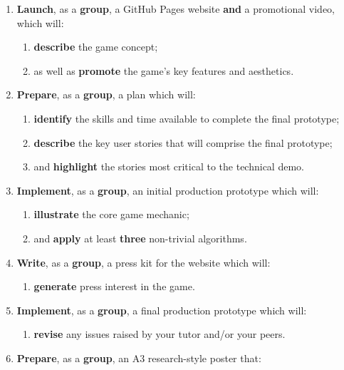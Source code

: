 \documentclass{../fal_assignment}
\begin{document}
\begin{enumerate}[label=(\Alph*)]
    \item \textbf{Launch}, as a \textbf{group}, a GitHub Pages website \textbf{and} a promotional video, which will:
    	\begin{enumerate}[label=\roman*.]
    		\item \textbf{describe} the game concept;
    		\item as well as \textbf{promote} the game's key features and aesthetics.
	\end{enumerate}
    \item \textbf{Prepare}, as a \textbf{group}, a plan which will:
    	\begin{enumerate}[label=\roman*.]
    	    	\item \textbf{identify} the skills and time available to complete the final prototype;
    		\item \textbf{describe} the key user stories that will comprise the final prototype;
    		\item and \textbf{highlight} the stories most critical to the technical demo.
	\end{enumerate}
    \item \textbf{Implement}, as a \textbf{group}, an initial production prototype which will:
    	\begin{enumerate}[label=\roman*.]
    		\item \textbf{illustrate} the core game mechanic;
    		\item and \textbf{apply} at least \textbf{three} non-trivial algorithms.
	\end{enumerate}
    \item \textbf{Write}, as a \textbf{group}, a press kit for the website which will:
    	\begin{enumerate}[label=\roman*.]
    		\item \textbf{generate} press interest in the game.
	\end{enumerate}	
    \item \textbf{Implement}, as a \textbf{group}, a final production prototype which will:
    	\begin{enumerate}[label=\roman*.]
    		\item \textbf{revise} any issues raised by your tutor and/or your peers.
	\end{enumerate}
    \item \textbf{Prepare}, as a \textbf{group}, an A3 research-style poster that:
    	\begin{enumerate}[label=\roman*.]

\end{enumerate}
\end{enumerate}
\end{document}
